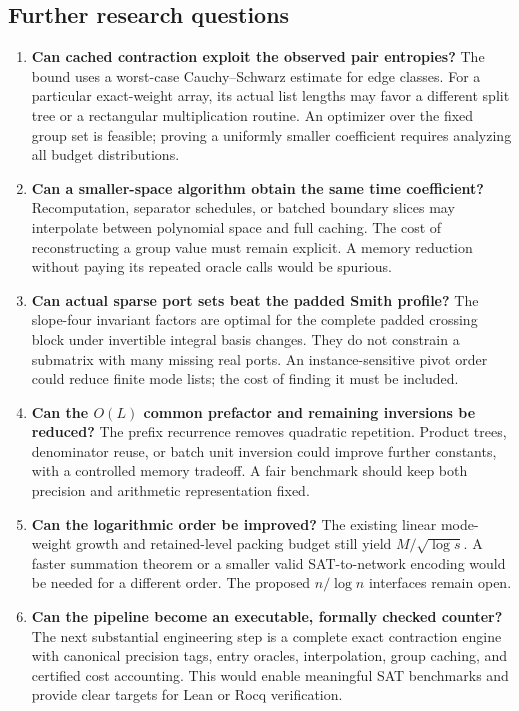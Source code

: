 \documentclass[11pt,letterpaper]{article}
\theoremstyle{definition}\newtheorem{definition}[theorem]{Definition}
\theoremstyle{remark}\newtheorem{remark}[theorem]{Remark}
\begin{document}
\subsection{Further research questions}
\begin{enumerate}[leftmargin=1.6em]
\item \textbf{Can cached contraction exploit the observed pair entropies?}
The bound uses a worst-case Cauchy--Schwarz estimate for edge classes. For a particular
exact-weight array, its actual list lengths may favor a different split tree or a
rectangular multiplication routine. An optimizer over the fixed group set is feasible;
proving a uniformly smaller coefficient requires analyzing all budget distributions.
\item \textbf{Can a smaller-space algorithm obtain the same time coefficient?}
Recomputation, separator schedules, or batched boundary slices may interpolate between
polynomial space and full caching. The cost of reconstructing a group value must remain
explicit. A memory reduction without paying its repeated oracle calls would be spurious.
\item \textbf{Can actual sparse port sets beat the padded Smith profile?}
The slope-four invariant factors are optimal for the complete padded crossing block
under invertible integral basis changes. They do not constrain a submatrix with many
missing real ports. An instance-sensitive pivot order could reduce finite mode lists;
the cost of finding it must be included.
\item \textbf{Can the $O(L)$ common prefactor and remaining inversions be reduced?}
The prefix recurrence removes quadratic repetition. Product trees, denominator reuse,
or batch unit inversion could improve further constants, with a controlled memory
tradeoff. A fair benchmark should keep both precision and arithmetic representation fixed.
\item \textbf{Can the logarithmic order be improved?}
The existing linear mode-weight growth and retained-level packing budget still yield
$M/\sqrt{\log s}$. A faster summation theorem or a smaller valid SAT-to-network encoding
would be needed for a different order. The proposed $n/\log n$ interfaces remain open.
\item \textbf{Can the pipeline become an executable, formally checked counter?}
The next substantial engineering step is a complete exact contraction engine with
canonical precision tags, entry oracles, interpolation, group caching, and certified
cost accounting. This would enable meaningful SAT benchmarks and provide clear targets
for Lean or Rocq verification.
\end{enumerate}
\end{document}
